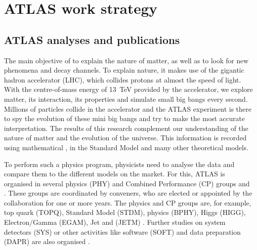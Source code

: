 
\section{ATLAS work strategy}%
\label{sec:ATLAS_work_strategy}

\subsection{ATLAS analyses and publications}%
\label{sec:The_ATLAS_Analyses_and_Publications}

The main objective of  to explain the nature of matter,
as well as to look for new phenomena and decay channels.
To explain nature, it makes use of the gigantic hadron accelerator (LHC),
which collides protons at almost the speed of light.
With the centre-of-mass energy of \SI{13}{\TeV} provided by the accelerator, we explore matter, its interaction, its properties and simulate small big bangs every second.
Millions of particles collide in the accelerator and the ATLAS experiment is there to spy the evolution of these mini big bangs and try to make the most accurate interpretation.
The results of this research complement our understanding of the nature of matter and the evolution of the universe.
This information is recorded using mathematical , in the  Standard Model and many other theoretical models.

To perform such a physics program, physicists need  to analyse the data and compare them to the different models on the market.
For this, ATLAS is organised in several physics (PHY) and  Combined Performance (CP) groups and .
These groups are coordinated by conveners,
who are elected or appointed by the collaboration for one or more years.
The physics and CP  groups are, for example, top quark (TOPQ), Standard Model (STDM), \PB physics (BPHY), Higgs (HIGG), Electron/Gamma (EGAM), Jet and  (JETM) .
Further studies on system detectors (SYS) or other activities like software (SOFT) and data preparation (DAPR) are also organised .

